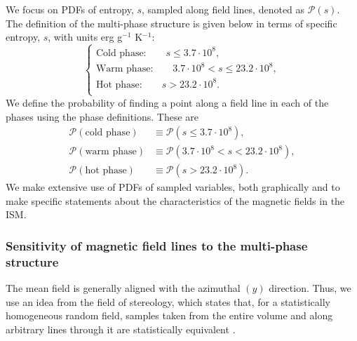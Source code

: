 \documentclass[useAMS,usenatbib]{mn2e}
\begin{document}
We focus on PDFs of entropy, $s$, sampled along field lines, denoted as $\mathcal{P}(s)$. The definition of the multi-phase structure is given below in terms of specific entropy, $s$, with units erg g$^{-1}$ K$^{-1}$:
\begin{equation}
\begin{cases}
\text{Cold phase:}\qquad s\leq3.7\cdot10^8,\\
\text{Warm phase:}\qquad 3.7\cdot10^8<s\leq23.2\cdot10^8,\\
\text{Hot phase:}\qquad s>23.2\cdot10^8.\\
\end{cases}
\label{phase_defns}
\end{equation} 
We define the probability of finding a point along a field line in each of the phases using the phase definitions. These are
\begin{align}
\mathcal P(\text{cold phase})&\equiv\mathcal P(s\leq3.7\cdot10^8),\nonumber\\
\mathcal P(\text{warm phase})&\equiv\mathcal P(3.7\cdot10^8<s<23.2\cdot10^8),\\
\mathcal P(\text{hot phase})&\equiv\mathcal P(s>23.2\cdot10^8).\nonumber
\end{align}
We make extensive use of PDFs of sampled variables, both graphically and to make specific statements about the characteristics of the magnetic fields in the ISM.
\subsubsection{Sensitivity of magnetic field lines to the multi-phase structure}
The mean field is generally aligned with the azimuthal $(y)$ direction. Thus, we use an idea from the field of stereology, which states that, for a statistically homogeneous random field, samples taken from the entire volume and along arbitrary lines through it are statistically equivalent \citep{BJ04}.
\end{document}
